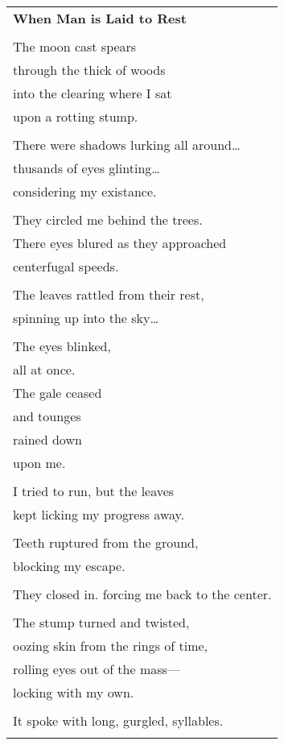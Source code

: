 \documentclass{article}
\begin{document}
\begin{center}
\begin{tabular}{l}
\textbf{When Man is Laid to Rest} \\
\\
The moon cast spears \\
through the thick of woods \\
into the clearing where I sat \\
upon a rotting stump. \\
\\
There were shadows lurking all around\ldots \\
thusands of eyes glinting\ldots \\
considering my existance. \\
\\
They circled me behind the trees. \\
There eyes blured as they approached \\
centerfugal speeds. \\
\\
The leaves rattled from their rest, \\
spinning up into the sky\ldots \\
\\
The eyes blinked, \\
all at once. \\
The gale ceased \\
and tounges \\
rained down \\
upon me. \\
\\
I tried to run, but the leaves \\
kept licking my progress away. \\
\\
Teeth ruptured from the ground, \\
blocking my escape. \\
\\
They closed in. forcing me back to the center. \\
\\
The stump turned and twisted, \\
oozing skin from the rings of time, \\
rolling eyes out of the mass--- \\
locking with my own. \\
\\
It spoke with long, gurgled, syllables. \\
\\

\end{tabular}
\end{center}
\end{document}
